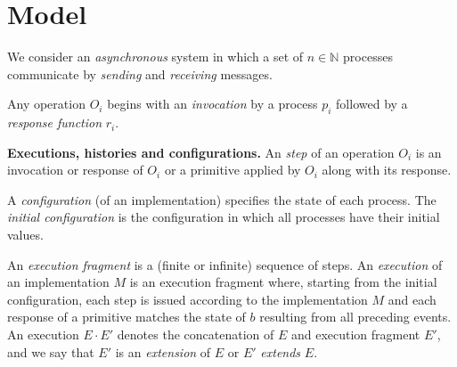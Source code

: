 \section{Model}
\label{sec:model}
%
We consider an \emph{asynchronous} system in which
a set of $n \in \mathbb{N}$ processes communicate by 
\emph{sending} and \emph{receiving} messages.
% 

Any operation $O_i$ begins with an \emph{invocation} by a process $p_i$ followed by a \emph{response
function} $r_i$. 

\vspace{1mm}\noindent\textbf{Executions, histories and configurations.}
An \emph{step} of an operation $O_i$
is an invocation or response of $O_i$ or a 
primitive applied by $O_i$
along with its response.

A \emph{configuration} (of an implementation) specifies the state of each process.
The \emph{initial configuration} is the configuration in which all 
processes have their initial values.

An \emph{execution fragment} is a (finite or infinite) sequence of steps.
An \emph{execution} of an implementation $M$ is an execution
fragment where, starting from the initial configuration, each step is
issued according to the implementation $M$ and each response of a primitive matches the state of $b$ resulting from all
preceding events.
An execution $E\cdot E'$ denotes the concatenation of $E$ and execution fragment $E'$,
and we say that $E'$ is an \emph{extension} of $E$ or $E'$ \emph{extends} $E$.
